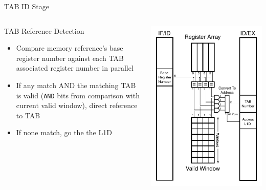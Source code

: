 \documentclass{beamer}
\begin{document}
\begin{frame}{TAB ID Stage}
   \begin{columns} %
      \begin{block}{TAB Reference Detection}
         \begin{itemize}
            \item Compare memory reference's base register number against
               each TAB associated register number in parallel
            \item If any match AND the matching TAB is valid (\texttt{AND} bits 
               from comparison with current valid window), direct reference to TAB
            \item If none match, go the the L1D
         \end{itemize}
      \end{block}
      \includegraphics[width=\textwidth]{figures/tabhardware_ID.pdf}
   \end{columns}
\end{frame}
\end{document}
